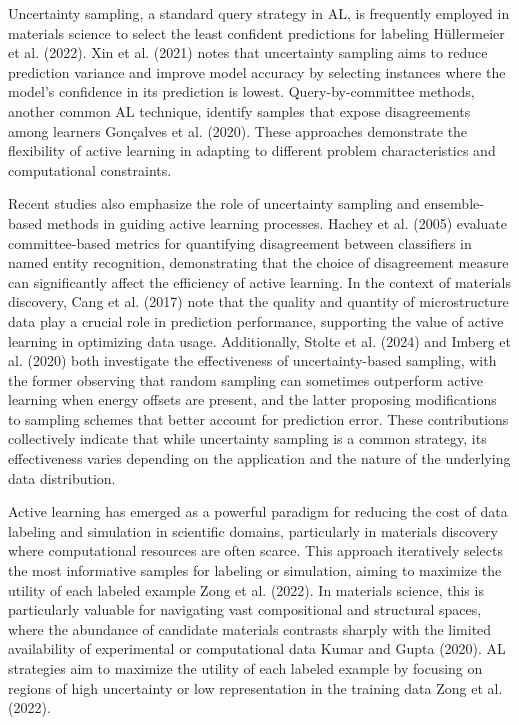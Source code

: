 Uncertainty sampling, a standard query strategy in AL, is frequently employed in materials science to select the least confident predictions for labeling Hüllermeier et al. (2022). Xin et al. (2021) notes that uncertainty sampling aims to reduce prediction variance and improve model accuracy by selecting instances where the model's confidence in its prediction is lowest. Query-by-committee methods, another common AL technique, identify samples that expose disagreements among learners Gonçalves et al. (2020). These approaches demonstrate the flexibility of active learning in adapting to different problem characteristics and computational constraints.

Recent studies also emphasize the role of uncertainty sampling and ensemble-based methods in guiding active learning processes. Hachey et al. (2005) evaluate committee-based metrics for quantifying disagreement between classifiers in named entity recognition, demonstrating that the choice of disagreement measure can significantly affect the efficiency of active learning. In the context of materials discovery, Cang et al. (2017) note that the quality and quantity of microstructure data play a crucial role in prediction performance, supporting the value of active learning in optimizing data usage. Additionally, Stolte et al. (2024) and Imberg et al. (2020) both investigate the effectiveness of uncertainty-based sampling, with the former observing that random sampling can sometimes outperform active learning when energy offsets are present, and the latter proposing modifications to sampling schemes that better account for prediction error. These contributions collectively indicate that while uncertainty sampling is a common strategy, its effectiveness varies depending on the application and the nature of the underlying data distribution.

Active learning has emerged as a powerful paradigm for reducing the cost of data labeling and simulation in scientific domains, particularly in materials discovery where computational resources are often scarce. This approach iteratively selects the most informative samples for labeling or simulation, aiming to maximize the utility of each labeled example Zong et al. (2022). In materials science, this is particularly valuable for navigating vast compositional and structural spaces, where the abundance of candidate materials contrasts sharply with the limited availability of experimental or computational data Kumar and Gupta (2020). AL strategies aim to maximize the utility of each labeled example by focusing on regions of high uncertainty or low representation in the training data Zong et al. (2022).

